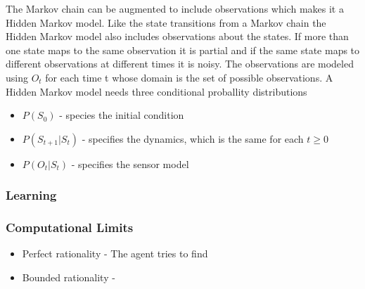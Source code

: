 The Markov chain can be augmented to include observations which makes it a
Hidden Markov model. Like the state transitions from a Markov chain the Hidden
Markov model also includes observations about the states. If more than one state
maps to the same observation it is partial and if the same state maps to
different observations at different times it is noisy. The observations are
modeled using $O_t$ for each time t whose domain is the set of possible
observations. A Hidden Markov model needs three conditional proballity
distributions
\begin{itemize}
  \item $P(S_0)$ - species the initial condition
  \item $P(S_{t+1}|S_t)$ - specifies the dynamics, which is the same for each $t
  \geq 0$
  \item $P(O_t|S_t)$ - specifies the sensor model
\end{itemize}


\subsubsection{Learning}


\subsubsection{Computational Limits}



\begin{itemize}
  \item Perfect rationality - The agent tries to find 
  \item Bounded rationality -
\end{itemize}
